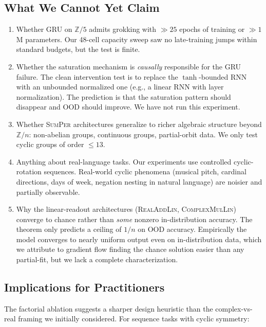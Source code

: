 \documentclass[11pt]{article}
\theoremstyle{definition}
\newcommand{\Z}{\mathbb{Z}}
\begin{document}
\subsection{What We Cannot Yet Claim}

\begin{enumerate}[itemsep=2pt]
\item Whether GRU on $\Z/5$ admits grokking with $\gg 25$ epochs of
training or $\gg 1$M parameters. Our 48-cell capacity sweep saw no
late-training jumps within standard budgets, but the test is finite.

\item Whether the saturation mechanism is \emph{causally}
responsible for the GRU failure. The clean intervention test is to
replace the $\tanh$-bounded RNN with an unbounded normalized one
(e.g., a linear RNN with layer normalization). The prediction is
that the saturation pattern should disappear and OOD should
improve. We have not run this experiment.

\item Whether \textsc{SumPer} architectures generalize to richer
algebraic structure beyond $\Z/n$: non-abelian groups, continuous
groups, partial-orbit data. We only test cyclic groups of order
$\leq 13$.

\item Anything about real-language tasks. Our experiments use
controlled cyclic-rotation sequences. Real-world cyclic phenomena
(musical pitch, cardinal directions, days of week, negation
nesting in natural language) are noisier and partially observable.

\item Why the linear-readout architectures (\textsc{RealAddLin},
\textsc{ComplexMulLin}) converge to chance rather than \emph{some}
nonzero in-distribution accuracy. The theorem only predicts a
ceiling of $1/n$ on OOD accuracy. Empirically the model converges
to nearly uniform output even on in-distribution data, which we
attribute to gradient flow finding the chance solution easier than
any partial-fit, but we lack a complete characterization.
\end{enumerate}

\subsection{Implications for Practitioners}

The factorial ablation suggests a sharper design heuristic than the
complex-vs-real framing we initially considered. For sequence tasks
with cyclic symmetry:
\end{document}
